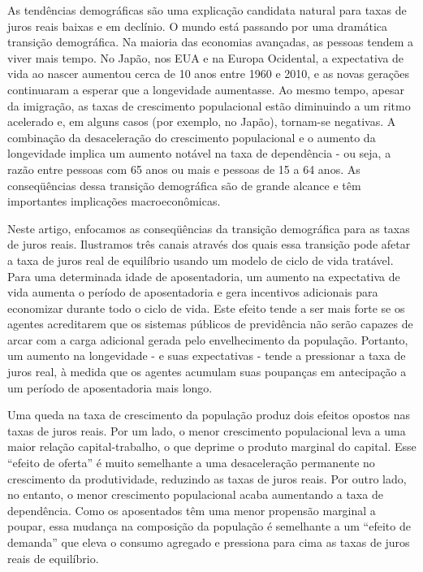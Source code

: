 \documentclass[11pt,oneside,a4paper]{article}
\begin{document}
As tendências demográficas são uma explicação candidata natural para taxas de juros reais baixas e em declínio. O mundo está passando por uma dramática transição demográfica. Na maioria das economias avançadas, as pessoas tendem a viver mais tempo. No Japão, nos EUA e na Europa Ocidental, a expectativa de vida ao nascer aumentou cerca de 10 anos entre 1960 e 2010, e as novas gerações continuaram a esperar que a longevidade aumentasse. Ao mesmo tempo, apesar da imigração, as taxas de crescimento populacional estão diminuindo a um ritmo acelerado e, em alguns casos (por exemplo, no Japão), tornam-se negativas. A combinação da desaceleração do crescimento populacional e o aumento da longevidade implica um aumento notável na taxa de dependência - ou seja, a razão entre pessoas com 65 anos ou mais e pessoas de 15 a 64 anos. As conseqüências dessa transição demográfica são de grande alcance e têm importantes implicações macroeconômicas.

Neste artigo, enfocamos as conseqüências da transição demográfica para as taxas de juros reais. Ilustramos três canais através dos quais essa transição pode afetar a taxa de juros real de equilíbrio usando um modelo de ciclo de vida tratável. Para uma determinada idade de aposentadoria, um aumento na expectativa de vida aumenta o período de aposentadoria e gera incentivos adicionais para economizar durante todo o ciclo de vida. Este efeito tende a ser mais forte se os agentes acreditarem que os sistemas públicos de previdência não serão capazes de arcar com a carga adicional gerada pelo envelhecimento da população. Portanto, um aumento na longevidade - e suas expectativas - tende a pressionar a taxa de juros real, à medida que os agentes acumulam suas poupanças em antecipação a um período de aposentadoria mais longo.

Uma queda na taxa de crescimento da população produz dois efeitos opostos nas taxas de juros reais. Por um lado, o menor crescimento populacional leva a uma maior relação capital-trabalho, o que deprime o produto marginal do capital. Esse “efeito de oferta” é muito semelhante a uma desaceleração permanente no crescimento da produtividade, reduzindo as taxas de juros reais. Por outro lado, no entanto, o menor crescimento populacional acaba aumentando a taxa de dependência. Como os aposentados têm uma menor propensão marginal a poupar, essa mudança na composição da população é semelhante a um “efeito de demanda” que eleva o consumo agregado e pressiona para cima as taxas de juros reais de equilíbrio.
\end{document}
